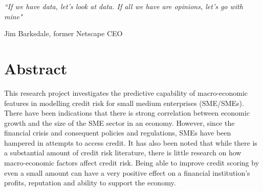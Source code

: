 \documentclass[11pt, oneside]{Thesis} %
\begin{document}
	\pagestyle{empty} %
	
	\null\vfill %
	
	\textit{``If we have data, let's look at data. If all we have are opinions, let's go with mine"}
	
	\begin{flushright}
		Jim Barksdale, former Netscape CEO
	\end{flushright}
	
	\vfill\vfill\vfill\vfill\vfill\vfill\null %
	
	\clearpage %
	
	\begin{comment}

	\addtotoc{Abstract} %
	
	\abstract{\addtocontents{toc}{\vspace{1em}} 
		\textit{Small-medium enterprises (SMEs) play an important role in the economy 
			worldwide  and  they  normally  need  to  borrow  funds  from  financial 
			institutions.  Thus,  an  accurate  credit  risk  model  to  predict  the  probability 
			that  these  firms  might  be  bankrupt  and  cannot  pay  back  the  loans  on 
			time is very crucial.}
	\end{comment}
		
	\chapter*{\centering Abstract}
	This research project investigates the predictive capability of macro-economic features in modelling credit risk for small medium enterprises (SME/SMEs). There have been indications that there is strong correlation between economic growth and the size of the SME sector in an economy. However, since the financial crisis and consequent policies and regulations, SMEs have been hampered in attempts to access credit. It has also been noted that while there is a substantial amount of credit risk literature, there is little research on how macro-economic factors affect credit risk. Being able to improve credit scoring by even a small amount can have a very positive effect on a financial institution's profits, reputation and ability to support the economy.
	
\end{document}
